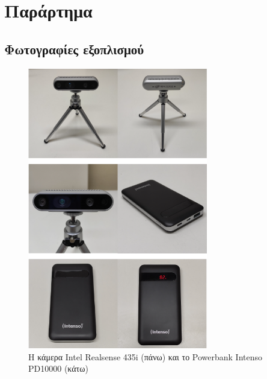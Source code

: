 \chapter{Παράρτημα} \label{ch:appendix}

\section{Φωτογραφίες εξοπλισμού}
\begin{figure}[H]
    \centering
    \includegraphics[width=0.7\textwidth]{images/equipment1.png}
    \caption{Η κάμερα Intel Realsense 435i (πάνω) και το Powerbank Intenso PD10000 (κάτω)}
    \label{fig:equipment1}
\end{figure}

